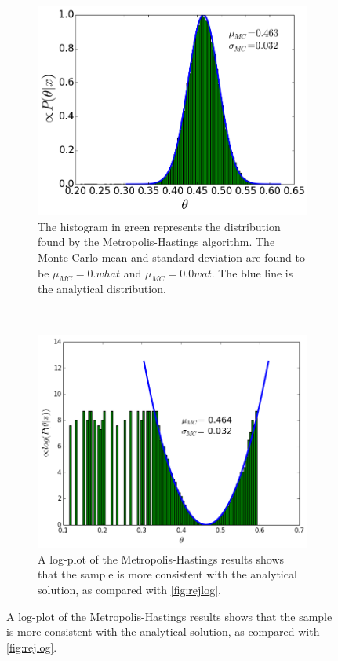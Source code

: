 \documentclass[a4paper,11pt,twoside]{article}
\begin{document}
\begin{figure}[ht]
	\centering
	\begin{subfigure}[t]{0.4\textwidth}
		\centering
		\includegraphics[width=\textwidth]{metropolishastings.png}
		\caption{The histogram in green represents the distribution
			found by the Metropolis-Hastings algorithm. The Monte Carlo mean and standard
			deviation are found to be $\mu_{MC} = 0.what$ and $\mu_{MC} = 0.0wat$.
			The blue line is the analytical distribution.}
		\label{fig:metropolis}
	\end{subfigure}
	~
	\begin{subfigure}[t]{0.4\textwidth}
		\centering
		\includegraphics[width=\textwidth]{recentlog.png}
		\caption{A log-plot of the Metropolis-Hastings results shows
		that the sample is more consistent with the analytical solution,
	as compared with \cref{fig:rejlog}.}
		\label{fig:mhlog}
	\end{subfigure}
\end{figure}
\end{document}
